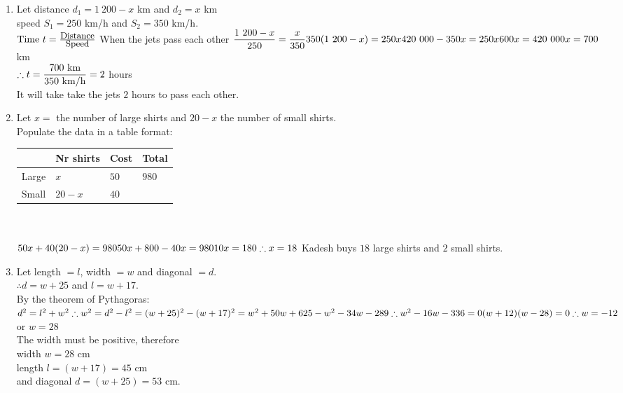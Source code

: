  \begin{solutions}{}{
\begin{enumerate}[itemsep=10pt, label=\textbf{\arabic*}. ] 


\item Let distance $d_1=1~200-x$ km and $d_2=x$ km \\
speed $S_1=250$ km/h and $S_2=350$ km/h. \\
$\mbox{Time } t = \frac{\mbox{\small Distance}}{\mbox{\small Speed}} \\[5pt]$
When the jets pass each other $\dfrac{1~200-x}{250} = \dfrac{x}{350}\\[5pt]
350(1~200-x)=250x\\
420~000 - 350x = 250x\\
600x = 420~000\\
x= 700$ km\\[5pt]

$\therefore t=\dfrac{700\mbox{ km}}{350{\mbox{ km/h}}}\\[5pt]
=2$ hours\\
It will take take the jets $2$ hours to pass each other.

\item  Let $x=$ the number of large shirts and $20-x$ the number of small shirts.\\
Populate the data in a table format:\\
  \begin{tabularx}{8cm}{ |X|X|X|X| }\hline
& Nr shirts & Cost & Total \\ \hline
Large & $x$ & $50$ & $980$\\ \hline
Small & $20-x$ & $40$&\\ \hline
\end{tabularx}\\
\\
$50x+40(20-x)=980\\
50x+800-40x=980\\
10x=180\\
\therefore x=18\\$
Kadesh buys $18$ large shirts and $2$ small shirts.

\item Let length $=l$, width $=w$ and diagonal $=d$.\\
$\therefore d=w+25$ and $l=w+17$.\\
By the theorem of Pythagoras:\\
$d^2 = l^2+w^2\\
\therefore w^2 = d^2-l^2\\
=(w+25)^2 - (w+17)^2\\
=w^2+50w+625-w^2-34w-289\\
\therefore w^2 - 16w - 336 = 0\\
(w+12)(w-28)=0\\
\therefore w= -12$ or $w=28$\\
The width must be positive, therefore \\
width $w=28$ cm\\ 
length $l=(w+17)=45$ cm \\
and diagonal $d=(w+25)=53$ cm.



\end{enumerate}}
\end{solutions}
